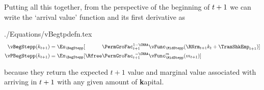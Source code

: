 \documentclass[titlepage, headings=optiontotocandhead]{\econtex}
\newcommand{\vNormedPermGroFacp}{\PermGroFac_{\stge+1}^{1-\CRRA}}
\begin{document}

Putting all this together, from the perspective of the beginning of {\interval} $t+1$ we can write the `arrival value' function and its first derivative as
\begin{verbatimwrite}{./Equations/vBegtpdefn.tex}
  \begin{equation}\begin{gathered}\begin{aligned}
        \vBegStepp({k}_{\stge+1})  & = \Ex_{\BegStepp}[\phantom{\Rfree}\vNormedPermGroFacp\null{\vFunc}_{\MidStepp}(\RNrm_{\stge+1}{k}_{\stge}+{\TranShkEmp}_{\stge+1})]  \label{eq:vFuncBegtpdefn}
\\  {\vPBegStepp}({k}_{\stge+1})  & = \Ex_{\BegStepp}[\Rfree \PermGroFac_{\stge+1}^{\phantom{1}-\CRRA} \null{\vFunc}_{\MidStepp}^{{m}}({m}_{\stge+1})]
  \end{aligned}\end{gathered}\end{equation}
\end{verbatimwrite}\unskip
\unskip %
because they return the expected $t+1$ value and marginal value associated with arriving in {\interval} $t+1$ with any given amount of \textbf{k}apital.  %
\end{document}
